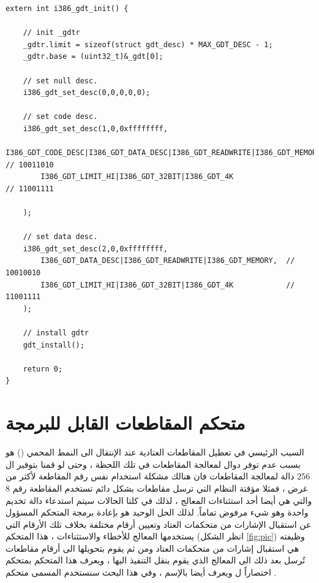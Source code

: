 \documentclass[document.tex]{subfiles}
\begin{document}
\begin{english}
\begin{lstlisting}[label=gdt_c,caption=\en{hal/gdt.cpp:Install GDT}]
extern int i386_gdt_init() {
	
	// init _gdtr
	_gdtr.limit = sizeof(struct gdt_desc) * MAX_GDT_DESC - 1;
	_gdtr.base = (uint32_t)&_gdt[0];
	
	// set null desc.
	i386_gdt_set_desc(0,0,0,0,0);
	
	// set code desc.
	i386_gdt_set_desc(1,0,0xffffffff,
		I386_GDT_CODE_DESC|I386_GDT_DATA_DESC|I386_GDT_READWRITE|I386_GDT_MEMORY, 	// 10011010
		I386_GDT_LIMIT_HI|I386_GDT_32BIT|I386_GDT_4K 								// 11001111
 
	);
	
	// set data desc.
	i386_gdt_set_desc(2,0,0xffffffff,
		I386_GDT_DATA_DESC|I386_GDT_READWRITE|I386_GDT_MEMORY, 	// 10010010
		I386_GDT_LIMIT_HI|I386_GDT_32BIT|I386_GDT_4K			// 11001111
	);
	
	// install gdtr
	gdt_install();
	
	return 0;
}

\end{lstlisting}
\end{english}


\section{متحكم المقاطعات القابل للبرمجة }
السبب الرئيسي في تعطيل المقاطعات العتادية عند الإنتقال الى النمط المحمي () هو بسبب عدم توفر دوال لمعالجة المقاطعات في تلك اللحظة ، وحتى لو قمنا بتوفير ال 256 دالة لمعالجة المقاطعات فان هنالك مشكلة استخدام نفس رقم المقاطعة لأكثر من غرض ، فمثلا مؤقتة النظام  التي ترسل مقاطعات بشكل دائم تستخدم المقاطعة رقم 8 والتي هي أيضا أحد استثناءات المعالج ، لذلك في كلتا الحالات سيتم استدعاء دالة تخديم واحدة وهو شيء مرفوض تماماً. لذلك الحل الوحيد هو بإعادة برمجة المتحكم المسؤول عن استقبال الإشارات من متحكمات العتاد  وتعيين أرقام مختلفة بخلاف تلك الأرقام التي يستخدمها المعالج للأخطاء والاستثناءات ، هذا المتحكم (انظر الشكل \ref{fig:pic}) وظيفته هي استقبال إشارات من متحكمات العتاد ومن ثم يقوم بتحويلها الى أرقام مقاطعات تُرسل بعد ذلك الى المعالج الذي يقوم بنقل التنفيذ اليها ، ويعرف هذا المتحكم بمتحكم  اختصاراً ل  ويعرف أيضا بالإسم  ، وفي هذا البحث سنستخدم المسمى متحكم .
\end{document}
